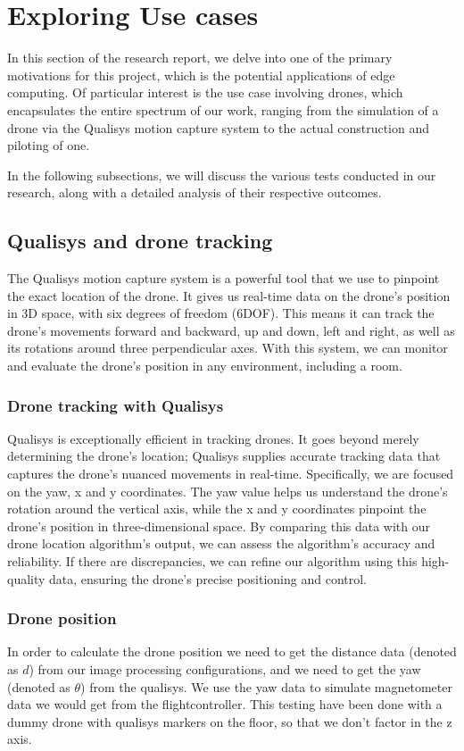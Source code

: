 \section{Exploring Use cases}

In this section of the research report, we delve into one of the primary motivations for this project, which is the potential applications of edge computing. Of particular interest is the use case involving drones, which encapsulates the entire spectrum of our work, ranging from the simulation of a drone via the Qualisys motion capture system to the actual construction and piloting of one.

In the following subsections, we will discuss the various tests conducted in our research, along with a detailed analysis of their respective outcomes.

\subsection{Qualisys and drone tracking}
The Qualisys motion capture system is a powerful tool that we use to pinpoint the exact location of the drone. It gives us real-time data on the drone's position in 3D space, with six degrees of freedom (6DOF). This means it can track the drone's movements forward and backward, up and down, left and right, as well as its rotations around three perpendicular axes. With this system, we can monitor and evaluate the drone's position in any environment, including a room. \cite{Qualisys}

\subsubsection{Drone tracking with Qualisys}
Qualisys is exceptionally efficient in tracking drones. It goes beyond merely determining the drone's location; Qualisys supplies accurate tracking data that captures the drone's nuanced movements in real-time. Specifically, we are focused on the yaw, x and y coordinates.
The yaw value helps us understand the drone's rotation around the vertical axis, while the x and y coordinates pinpoint the drone's position in three-dimensional space. By comparing this data with our drone location algorithm's output, we can assess the algorithm's accuracy and reliability. If there are discrepancies, we can refine our algorithm using this high-quality data, ensuring the drone's precise positioning and control.

\subsubsection{Drone position}
In order to calculate the drone position we need to get the distance data (denoted as $d$) from our image processing configurations, and we need to get the yaw (denoted as $\theta$) from the qualisys.
We use the yaw data to simulate magnetometer data we would get from the flightcontroller.
This testing have been done with a dummy drone with qualisys markers on the floor, so that we don't factor in the z axis.

